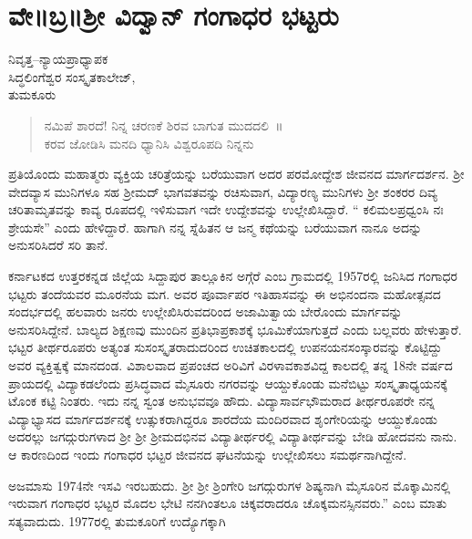{\fontsize{14}{16}\selectfont
\chapter{ವೇ॥ಬ್ರ॥ಶ್ರೀ ವಿದ್ವಾನ್ ಗಂಗಾಧರ ಭಟ್ಟರು}

\begin{center}
\smallskip
ನಿವೃತ್ತ–ನ್ಯಾಯಪ್ರಾಧ್ಯಾಪಕ\\
ಸಿದ್ಧಲಿಂಗೆಶ್ವರ ಸಂಸ್ಕೃತಕಾಲೇಜ್,\\
ತುಮಕೂರು
\addrule
\end{center}
\begin{verse}
ನಮಿಪೆ ಶಾರದೆ! ನಿನ್ನ ಚರಣಕೆ ಶಿರವ ಬಾಗುತ ಮುದದಲಿ~॥\\
ಕರವ ಜೋಡಿಸಿ ಮನದಿ ಧ್ಯಾನಿಸಿ ವಿಶ್ವರೂಪದಿ ನಿನ್ನನು\\
\end{verse}

ಪ್ರತಿಯೊಂದು ಮಹಾತ್ಮರು ವ್ಯಕ್ತಿಯ ಚರಿತ್ರೆಯನ್ನು ಬರೆಯುವಾಗ ಅದರ ಪರಮೋದ್ದೇಶ ಜೀವನದ ಮಾರ್ಗದರ್ಶನ. ಶ್ರೀ ವೇದವ್ಯಾಸ ಮುನಿಗಳೂ ಸಹ ಶ್ರೀಮದ್ ಭಾಗವತವನ್ನು ರಚಿಸುವಾಗ, ವಿದ್ಯಾರಣ್ಯ ಮುನಿಗಳು ಶ್ರೀ ಶಂಕರರ ದಿವ್ಯ ಚರಿತಾಮೃತವನ್ನು ಕಾವ್ಯ ರೂಪದಲ್ಲಿ ಇಳಿಸುವಾಗ ಇದೇ ಉದ್ದೇಶವನ್ನು ಉಲ್ಲೇಖಿಸಿದ್ದಾರೆ. “ ಕಲಿಮಲಪ್ರಧ್ವಂಸಿ ನಃ ಶ್ರೇಯಸೇ” ಎಂದು ಹೇಳಿದ್ದಾರೆ. ಹಾಗಾಗಿ ನನ್ನ ಸ್ನೆಹಿತನ ಆ ಜನ್ಮ ಕಥೆಯನ್ನು ಬರೆಯುವಾಗ ನಾನೂ ಅದನ್ನು ಅನುಸರಿಸಿದರೆ ಸರಿ ತಾನೆ.

ಕರ್ನಾಟಕದ ಉತ್ತರಕನ್ನಡ ಜಿಲ್ಲೆಯ ಸಿದ್ದಾಪುರ ತಾಲ್ಲೂಕಿನ ಅಗ್ಗೆರೆ ಎಂಬ ಗ್ರಾಮದಲ್ಲಿ 1957ರಲ್ಲಿ ಜನಿಸಿದ ಗಂಗಾಧರ ಭಟ್ಟರು ತಂದೆಯವರ ಮೂರನೆಯ ಮಗ. ಅವರ ಪೂರ್ವಾಪರ ಇತಿಹಾಸವನ್ನು ಈ ಅಭಿನಂದನಾ ಮಹೋತ್ಸವದ ಸಂದರ್ಭದಲ್ಲಿ  ಹಲವಾರು ಜನರು ಉಲ್ಲೇಖಿಸಿರುವದರಿಂದ ಅಜಾಮಿತ್ವಾಯ ಬೇರೊಂದು ಮಾರ್ಗವನ್ನು ಅನುಸರಿಸಿದ್ದೇನೆ. ಬಾಲ್ಯದ ಶಿಕ್ಷಣವು ಮುಂದಿನ ಪ್ರತಿಭಾಪ್ರಕಾಶಕ್ಕೆ ಭೂಮಿಕೆಯಾಗುತ್ತದೆ ಎಂದು ಬಲ್ಲವರು ಹೇಳುತ್ತಾರೆ. ಭಟ್ಟರ ತೀರ್ಥರೂಪರು ಅತ್ಯಂತ ಸುಸಂಸ್ಕೃತರಾದುದರಿಂದ ಉಚಿತಕಾಲದಲ್ಲಿ ಉಪನಯನಸಂಸ್ಕಾರವನ್ನು ಕೊಟ್ಟಿದ್ದು ಅವರ ವ್ಯಕ್ತಿತ್ವಕ್ಕೆ ಮಾನದಂಡ. ವಿಶಾಲವಾದ ಪ್ರಪಂಚದ ಅರಿವಿಗೆ ವಿರಳಾವಕಾಶವಿದ್ದ ಕಾಲದಲ್ಲಿ ತನ್ನ 18ನೇ ವರ್ಷದ ಪ್ರಾಯದಲ್ಲಿ ವಿದ್ಯಾಕಡಲೆಂದು ಪ್ರಸಿದ್ಧವಾದ ಮೈಸೂರು ನಗರವನ್ನು ಆಯ್ದುಕೊಂಡು ಮನೆಬಿಟ್ಟು ಸಂಸ್ಕೃತಾಧ್ಯಯನಕ್ಕೆ ಟೊಂಕ ಕಟ್ಟಿ ನಿಂತರು. ಇದು ನನ್ನ ಸ್ವಂತ ಅನುಭವವೂ ಹೌದು. ವಿದ್ಯಾಸಾರ್ವಭೌಮರಾದ ತೀರ್ಥರೂಪರೇ ನನ್ನ ವಿದ್ಯಾಭ್ಯಾಸದ ಮಾರ್ಗದರ್ಶನಕ್ಕೆ ಉತ್ಸುಕರಾಗಿದ್ದರೂ ಶಾರದೆಯ ಮಂದಿರವಾದ ಶೃಂಗೇರಿಯನ್ನು ಆಯ್ದುಕೊಂಡು ಅದರಲ್ಲು ಜಗದ್ಗುರುಗಳಾದ ಶ್ರೀ ಶ್ರೀ ಶ್ರೀಮದಭಿನವ ವಿದ್ಯಾತೀರ್ಥರಲ್ಲಿ ವಿದ್ಯಾತೀರ್ಥವನ್ನು ಬೇಡಿ ಹೋದವನು ನಾನು. ಆ ಕಾರಣದಿಂದ ಇಂದು ಗಂಗಾಧರ ಭಟ್ಟರ ಜೀವನದ ಘಟನೆಯನ್ನು ಉಲ್ಲೇಖಿಸಲು ಸಮರ್ಥನಾಗಿದ್ದೇನೆ.

ಅಜಮಾಸು 1974ನೇ ಇಸವಿ ಇರಬಹುದು. ಶ್ರೀ ಶ್ರೀ ಶ್ರಿಂಗೇರಿ ಜಗದ್ಗುರುಗಳ ಶಿಷ್ಯನಾಗಿ ಮೈಸೂರಿನ ಮೊಕ್ಕಾಮಿನಲ್ಲಿ ಇರುವಾಗ ಗಂಗಾಧರ ಭಟ್ಟರ ಮೊದಲ ಭೇಟಿ ನನಗಿಂತಲೂ ಚಿಕ್ಕವರಾದರೂ ಚೊಕ್ಕಮನಸ್ಸಿನವರು.”  ಎಂಬ ಮಾತು ಸತ್ಯವಾದುದು. 1977ರಲ್ಲಿ ತುಮಕೂರಿಗೆ ಉದ್ಯೊಗಕ್ಕಾಗಿ

}
